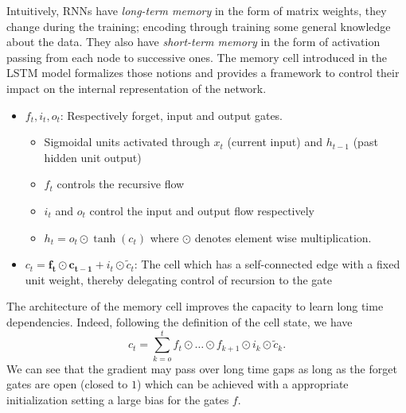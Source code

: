 Intuitively, RNNs have \textit{long-term memory} in the form of matrix weights,
they change during the training; encoding through training some general
knowledge about the data. They also have \textit{short-term memory} in the form
of activation passing from each node to successive ones. The memory cell
introduced in the LSTM model formalizes those notions and provides a framework
to control their impact on the internal representation of the network.
\begin{center}
    \begin{itemize}
    \item $f_t, i_t, o_t$: Respectively forget, input and output gates.
        \begin{itemize}
            \normalsize
            \item Sigmoidal units activated through  $x_t$ (current input) and
                $h_{t-1}$ (past hidden unit output) \item $f_t$ controls the
                recursive flow
            \item $i_t$ and $o_t$ control the input and output flow
                respectively
            \item $h_t = o_t \odot \tanh(c_t)$ where $\odot$ denotes element
                wise multiplication.
        \end{itemize}
    \item $c_t = \mathbf{f_t \odot c_{t-1}} + i_t \odot \tilde{c}_t$: The cell
    which has a self-connected edge with a fixed unit weight, thereby delegating
    control of recursion to the gate
    \end{itemize}
\end{center}
The architecture of the memory cell improves the capacity to learn long time 
dependencies. Indeed, following the definition of the cell state, we have
\begin{equation*}
	c_t = \sum_{k = o}^{t}f_t \odot \dots \odot f_{k + 1} \odot i_k \odot \tilde{c}_k.
\end{equation*}
We can see that the gradient may pass over long time gaps as long as the forget 
gates are open (closed to $1$) which can be achieved with a appropriate initialization
setting a large bias  for the gates $f$. 
 

